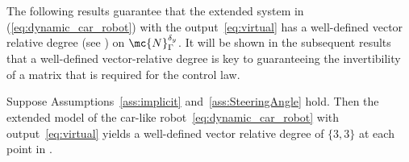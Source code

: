 The following results guarantee that the extended system in (\ref{eq:dynamic_car_robot}) with the output~\eqref{eq:virtual} has a well-defined vector relative degree (see ) on $\mc{N}_{\Gamma}^{\by}$. It will be shown in the subsequent results that a well-defined vector-relative degree is key to guaranteeing the invertibility of a matrix that is required for the control law. 
\begin{proposition}
\label{prop:relative_degree}
  Suppose Assumptions~\ref{ass:implicit} and~\ref{ass:SteeringAngle} hold. Then the extended model of the car-like robot~\eqref{eq:dynamic_car_robot} with output~\eqref{eq:virtual}
yields a well-defined vector relative degree of $\{3,3\}$ at each point {in} .
\end{proposition}
